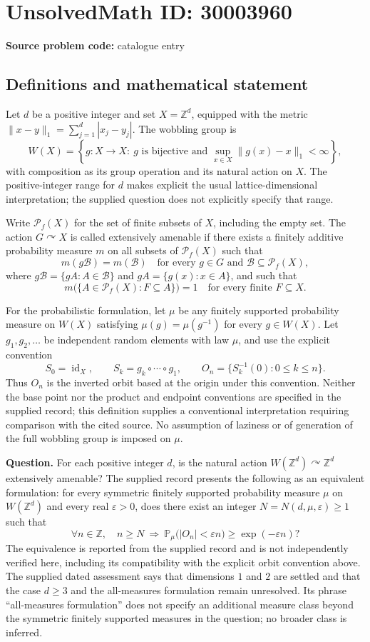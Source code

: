 \documentclass[11pt]{article}
\newcommand{\Z}{\mathbb{Z}}
\begin{document}
\section*{UnsolvedMath ID: 30003960}
\textbf{Source problem code:} catalogue entry
\subsection{Definitions and mathematical statement}
Let \(d\) be a positive integer and set \(X=\Z^d\), equipped with the metric \(\|x-y\|_1=\sum_{j=1}^d|x_j-y_j|\). The wobbling group is
\[
W(X)=\left\{g:X\to X:\ g\text{ is bijective and }\sup_{x\in X}\|g(x)-x\|_1<\infty\right\},
\]
with composition as its group operation and its natural action on \(X\). The positive-integer range for \(d\) makes explicit the usual lattice-dimensional interpretation; the supplied question does not explicitly specify that range.

Write \(\mathcal P_f(X)\) for the set of finite subsets of \(X\), including the empty set. The action \(G\curvearrowright X\) is called extensively amenable if there exists a finitely additive probability measure \(m\) on all subsets of \(\mathcal P_f(X)\) such that
\[
m(g\mathcal B)=m(\mathcal B)
\quad\text{for every }g\in G\text{ and }\mathcal B\subseteq\mathcal P_f(X),
\]
where \(g\mathcal B=\{gA:A\in\mathcal B\}\) and \(gA=\{g(x):x\in A\}\), and such that
\[
m\bigl(\{A\in\mathcal P_f(X):F\subseteq A\}\bigr)=1
\quad\text{for every finite }F\subseteq X.
\]

For the probabilistic formulation, let \(\mu\) be any finitely supported probability measure on \(W(X)\) satisfying \(\mu(g)=\mu(g^{-1})\) for every \(g\in W(X)\). Let \(g_1,g_2,\ldots\) be independent random elements with law \(\mu\), and use the explicit convention
\[
S_0=\operatorname{id}_X,\qquad S_k=g_k\circ\cdots\circ g_1,\qquad
O_n=\{S_k^{-1}(0):0\leq k\leq n\}.
\]
Thus \(O_n\) is the inverted orbit based at the origin under this convention. Neither the base point nor the product and endpoint conventions are specified in the supplied record; this definition supplies a conventional interpretation requiring comparison with the cited source. No assumption of laziness or of generation of the full wobbling group is imposed on \(\mu\).

\textbf{Question.} For each positive integer \(d\), is the natural action \(W(\Z^d)\curvearrowright\Z^d\) extensively amenable? The supplied record presents the following as an equivalent formulation: for every symmetric finitely supported probability measure \(\mu\) on \(W(\Z^d)\) and every real \(\varepsilon>0\), does there exist an integer \(N=N(d,\mu,\varepsilon)\geq1\) such that
\[
\forall n\in\Z,\quad n\geq N\ \Longrightarrow\
\mathbb P_\mu\bigl(|O_n|<\varepsilon n\bigr)\geq\exp(-\varepsilon n)?
\]
The equivalence is reported from the supplied record and is not independently verified here, including its compatibility with the explicit orbit convention above. The supplied dated assessment says that dimensions \(1\) and \(2\) are settled and that the case \(d\geq3\) and the all-measures formulation remain unresolved. Its phrase ``all-measures formulation'' does not specify an additional measure class beyond the symmetric finitely supported measures in the question; no broader class is inferred.
\end{document}
